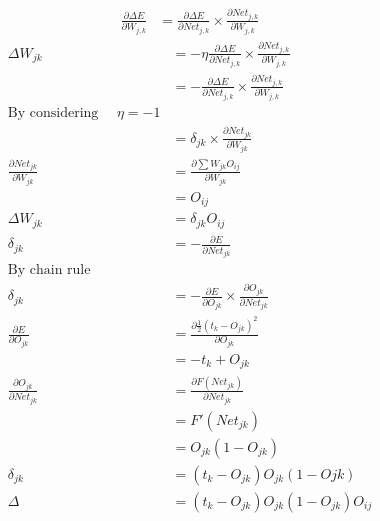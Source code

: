 \begin{align}
\frac{\partial \Delta E}{\partial W_{j,k}} &= \frac{\partial \Delta E}{\partial Net_{j,k}} \times
                                             \frac{\partial Net_{j,k}}{\partial W_{j,k}} 
\end{align}  
\begin{align*}                                        
\Delta W_{jk} &= - \eta \frac{\partial \Delta E}{\partial Net_{j,k}} \times
                   \frac{\partial Net_{j,k}}{\partial W_{j,k}} \\
              &= - \frac{\partial \Delta E}{\partial Net_{j,k}} \times
                   \frac{\partial Net_{j,k}}{\partial W_{j,k}} \\
\text{By considering~~~~}  \eta = -1 \\
		      &=  \delta_{jk} \times
                  \frac{\partial Net_{jk}}{\partial W_{jk}} \\
\frac{\partial Net_{jk}}{\partial W_{jk}} &= \frac{ \partial \sum W_{jk} O_{ij}}{\partial W_{jk}} \\
										  &= O_{ij} \\
\Delta W_{jk} &= \delta_{jk} O_{ij} \\
\delta _{jk}       &= - \frac{\partial E}{\partial Net_{jk}} \\
\text{By chain rule}  \\
\delta_{jk}   &= - \frac{\partial E}{\partial O_{jk}} \times \frac{\partial O_{jk}}{\partial Net_{jk}} \\
\frac{\partial E}{\partial O_{jk}} &= \frac{\partial \frac{1}{2}(t_k - O_{jk})^2}{\partial O_{jk}} \\
			  &= -t_k + O_{jk} \\
\frac{\partial O_{jk}}{\partial Net_{jk}} &= \frac{\partial F(Net_{jk})}{\partial Net_{jk}} \\
										  &= F'(Net_{jk}) \\
										  &= O_{jk} (1-O_{jk}) \\
\delta_{jk} &= (t_k - O_{jk})O_{jk}(1-O{jk}) \\
\Delta      &= (t_k - O_{jk})O_{jk}(1-O_{jk})O_{ij}
\end{align*} 

